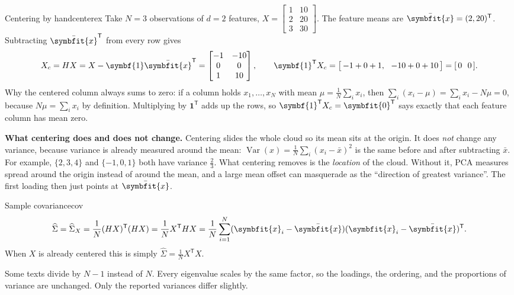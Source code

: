 \documentclass[11pt]{article}
\newcommand{\bm}[1]{\symbfit{#1}}
\newcommand{\vx}{\bm{x}}
\newcommand{\one}{\symbf{1}}
\newcommand{\xbar}{\bar{\bm{x}}}
\newcommand{\Sig}{\widehat{\Sigma}}
\newcommand{\T}{^{\mathsf T}}
\begin{document}
\begin{example}{Centering by hand}{centerex}
Take $N=3$ observations of $d=2$ features,
$X=\begin{bmatrix}1&10\\2&20\\3&30\end{bmatrix}$. The feature means are
$\xbar=(2,20)\T$. Subtracting $\xbar\T$ from every row gives
\[
X_c=HX=X-\one\xbar\T=\begin{bmatrix}-1&-10\\0&0\\1&10\end{bmatrix},
\qquad
\one\T X_c=\big[\,{-1}+0+1,\ \ {-10}+0+10\,\big]=[\,0\ \ 0\,].
\]
Why the centered column always sums to zero: if a column holds $x_1,\dots,x_N$ with mean
$\mu=\tfrac1N\sum_ix_i$, then $\sum_i(x_i-\mu)=\sum_ix_i-N\mu=0$, because $N\mu=\sum_ix_i$ by definition.
Multiplying by $\one\T$ adds up the rows, so $\one\T X_c=\bm0\T$ says exactly that
each feature column has mean zero.
\end{example}

\begin{intuition}
\textbf{What centering does and does not change.} Centering slides the whole cloud so
its mean sits at the origin. It does \emph{not} change any variance, because variance
is already measured around the mean: $\operatorname{Var}(x)=\tfrac1N\sum_i(x_i-\bar x)^2$
is the same before and after subtracting $\bar x$. For example, $\{2,3,4\}$ and
$\{-1,0,1\}$ both have variance $\tfrac23$. What centering removes is the
\emph{location} of the cloud. Without it, PCA measures spread around the origin
instead of around the mean, and a large mean offset can masquerade as the
``direction of greatest variance''. The first loading then just points at $\xbar$.
\end{intuition}

\begin{definition}{Sample covariance}{cov}
\[
\Sig=\Sig_X=\frac1N(HX)\T(HX)=\frac1N X\T H X=\frac1N\sum_{i=1}^N(\vx_i-\xbar)(\vx_i-\xbar)\T.
\]
When $X$ is already centered this is simply $\Sig=\tfrac1N X\T X$.
\end{definition}

\begin{careful}
Some texts divide by $N-1$ instead of $N$. Every eigenvalue scales by the same factor,
so the loadings, the ordering, and the proportions of variance are unchanged. Only the
reported variances differ slightly.
\end{careful}
\end{document}
